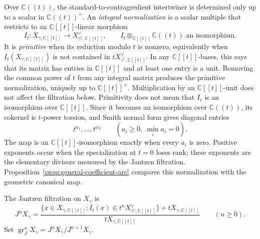 \documentclass[11pt]{amsart}
\theoremstyle{definition}
\theoremstyle{remark}
\newcommand{\C}{\mathbb C}
\newcommand{\A}{\C[[t]]}
\newcommand{\K}{\C((t))}
\begin{document}
Over $\K$, the standard-to-contragredient intertwiner is determined only up
to a scalar in $\K^\times$.  An \emph{integral normalization} is a scalar
multiple that restricts to an $\A$-linear morphism
\[
 I_t:X_{\gamma,\A}\longrightarrow X_{\gamma^\dagger,\A}^{\vee},
 \qquad I_t\otimes_{\A}\K\text{ an isomorphism}.
\]
It is \emph{primitive} when its reduction modulo $t$ is nonzero, equivalently
when $I_t(X_{\gamma,\A})$ is not contained in
$tX_{\gamma^\dagger,\A}^{\vee}$.  In any $\A$-bases, this says that its
matrix has entries in $\A$ and at least one entry is a unit.  Removing the
common power of $t$ from any integral matrix produces the primitive
normalization, uniquely up to $\A^\times$.  Multiplication by an $\A$-unit
does not affect the filtration below.
Primitivity does not mean that $I_t$ is an isomorphism over $\A$.  Since it
becomes an isomorphism over $\K$, its cokernel is $t$-power torsion, and Smith
normal form gives diagonal entries
\[
 t^{a_1},\ldots,t^{a_N}\qquad(a_i\geq0,\ \min_i a_i=0).
\]
The map is an $\A$-isomorphism exactly when every $a_i$ is zero.  Positive
exponents occur when the specialization at $t=0$ loses rank; these exponents
are the elementary divisors measured by the Jantzen filtration.
Proposition~\ref{prop:general-coefficient-arc} compares this normalization
with the geometric canonical map.

The Jantzen filtration on $X_\gamma$ is
\begin{equation}\label{eq:jantzen}
 J^nX_\gamma=
 \frac{\{x\in X_{\gamma,\A}: I_t(x)\in
 t^nX_{\gamma^\dagger,\A}^{\vee}\}+tX_{\gamma,\A}}
 {tX_{\gamma,\A}}\qquad(n\geq0).
\end{equation}
Set
$\operatorname{gr}_J^nX_\gamma=J^nX_\gamma/J^{n+1}X_\gamma$.
\end{document}
